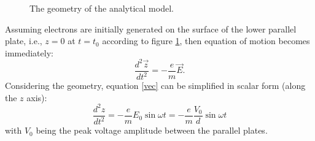 \documentclass[a4paper,11pt]{article}
\begin{document}
\begin{figure}[H]
\begin{center}

\end{center}
\caption{The geometry of the analytical model.\label{fig:sk}}
\end{figure}
Assuming electrons are initially generated on the surface of the lower parallel plate, i.e., $z=0$ at $t=t_0$ according to figure \ref{fig:sk}, then equation of motion becomes immediately: 
\begin{equation}
\frac{d^2\vec{z}}{dt^2} = -\frac{e}{m}\vec{E}.\label{vec}
\end{equation}
Considering the geometry, equation \eqref{vec} can be simplified in scalar form (along the $z$ axis):
\begin{equation}
\frac{d^2z}{dt^2} = -\frac{e}{m} E_0\sin\omega t= - \frac{e}{m}\frac{V_0}{d}\sin\omega t \label{scalar}
\end{equation}
with $V_0$ being  the peak voltage amplitude between the parallel plates.
\end{document}

